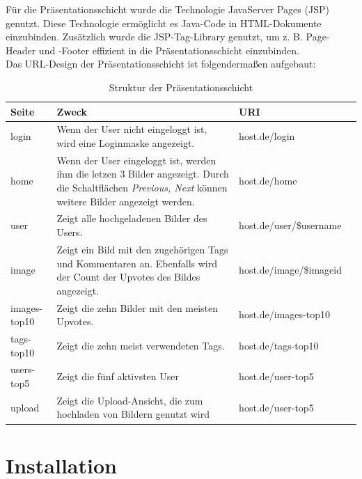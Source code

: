 \documentclass[12pt, oneside, a4paper]{article}		%
\begin{document}
Für die Präsentationsschicht wurde die Technologie JavaServer Pages (JSP) genutzt. Diese Technologie ermöglicht es Java-Code in HTML-Dokumente einzubinden. Zusätzlich wurde die JSP-Tag-Library genutzt, um z. B. Page-Header und -Footer effizient in die Präsentationsschicht einzubinden. \\

Das URL-Design der Präsentationsschicht ist folgendermaßen aufgebaut:	

\begin{table}[ht!]
\centering
\begin{tabular}{| p{1.9cm} | p{6.2cm} | p{6.2cm} | l}
\hline                       
\textbf{Seite}	& \textbf{Zweck}	& \textbf{URI}	\\
\hline
login	& Wenn der User nicht eingeloggt ist, wird eine Loginmaske angezeigt.	& host.de/login \\
\hline
home	& Wenn der User eingeloggt ist, werden ihm die letzen 3 Bilder angezeigt. Durch die Schaltflächen \textit{Previous, Next} können weitere Bilder angezeigt werden.	& host.de/home \\
\hline
user	& Zeigt alle hochgeladenen Bilder des Users.	& host.de/user/\${username} \\
\hline
image	& Zeigt ein Bild mit den zugehörigen Tags und Kommentaren an. Ebenfalls wird der Count der Upvotes des Bildes angezeigt.	& host.de/image/\${imageid} \\
\hline
images-top10	& Zeigt die zehn Bilder mit den meisten Upvotes.	& host.de/images-top10 \\
\hline
tags-top10	& Zeigt die zehn meist verwendeten Tags.	& host.de/tags-top10 \\
\hline
users-top5	& Zeigt die fünf aktivsten User	& host.de/user-top5 \\
\hline
upload	& Zeigt die Upload-Ansicht, die zum hochladen von Bildern genutzt wird	& host.de/user-top5 \\
\hline
\end{tabular}
\caption{Struktur der Präsentationsschicht}
\label{StructurePresentationlayer}
\end{table}


\newpage
\section{Installation}
\end{document}
